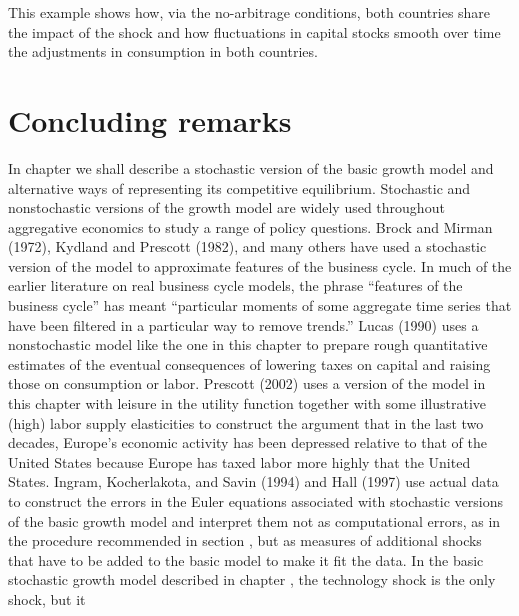 This example shows how, via the no-arbitrage conditions,  both countries share the impact of the shock
 and how  fluctuations in capital stocks  smooth  over
time the adjustments in consumption in both countries.


\section{Concluding remarks}

   In chapter  we shall describe a stochastic version of the basic growth
model and alternative ways of representing its competitive equilibrium.
 Stochastic and nonstochastic versions
of the growth model are widely used throughout aggregative
economics to study a range of policy questions. Brock and Mirman
(1972), Kydland and Prescott (1982), and many others have used  a
stochastic version of the model to approximate features of the
business cycle. In much of the earlier literature on real
business cycle models, the phrase ``features of the business
cycle'' has meant ``particular moments of some aggregate time series
that have been filtered in a particular way to remove trends.''
Lucas (1990) uses a nonstochastic model like the one in this chapter
to prepare rough quantitative estimates of the eventual
consequences of lowering taxes on capital and raising those on
consumption or labor. Prescott (2002) uses a version of the model
in this chapter with leisure in the utility function together with
some illustrative
 (high) labor supply elasticities to construct the argument that in the last two
decades, Europe's economic activity has been depressed relative to
that of the United States because Europe has taxed labor more highly that the
United States.  Ingram, Kocherlakota, and Savin (1994) and  Hall (1997)
use actual data to construct the errors in the Euler equations
associated with stochastic versions of the basic growth model and
interpret them not as computational errors, as in the procedure
recommended in section
, but as measures of additional shocks that have to be added to the basic model to make it fit the data.
In the basic stochastic growth model described  in chapter
, the technology shock  is the only shock, but it
